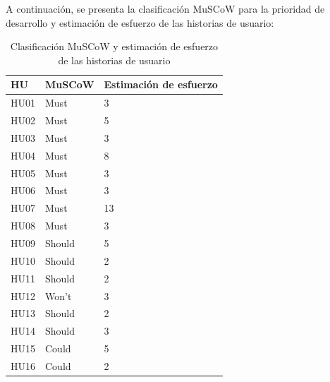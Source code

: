 ﻿\documentclass{iccmemoria}
\begin{document}
A continuación, se presenta la clasificación MuSCoW para la prioridad de desarrollo y estimación de esfuerzo de las historias de usuario:
\begin{table}[H]
    \centering
    \caption{Clasificación MuSCoW y estimación de esfuerzo de las historias de usuario}
    \label{tab:moscow_estimacion}

    \begin{tabular}{|p{2cm}|p{2cm}|p{3cm}|} 
        \hline %
        
        \textbf{HU} & \textbf{MuSCoW} & \textbf{Estimación de esfuerzo}\\
        \hline %
        
HU01 & Must & 3\\
\hline
HU02  & Must & 5\\
\hline
HU03 & Must & 3\\
\hline
HU04 & Must & 8\\
\hline
HU05 & Must & 3\\
\hline
HU06 & Must & 3\\
\hline
HU07 & Must & 13\\
\hline
HU08 & Must & 3\\
\hline
HU09 & Should & 5\\
\hline
HU10 & Should & 2\\
\hline
HU11 & Should & 2\\
\hline
HU12 & Won't & 3\\
\hline
HU13 & Should & 2\\
\hline
HU14 & Should & 3 \\
\hline
HU15 & Could & 5 \\
\hline
HU16 & Could & 2\\
        \hline %
    \end{tabular}
\end{table}
\end{document}
